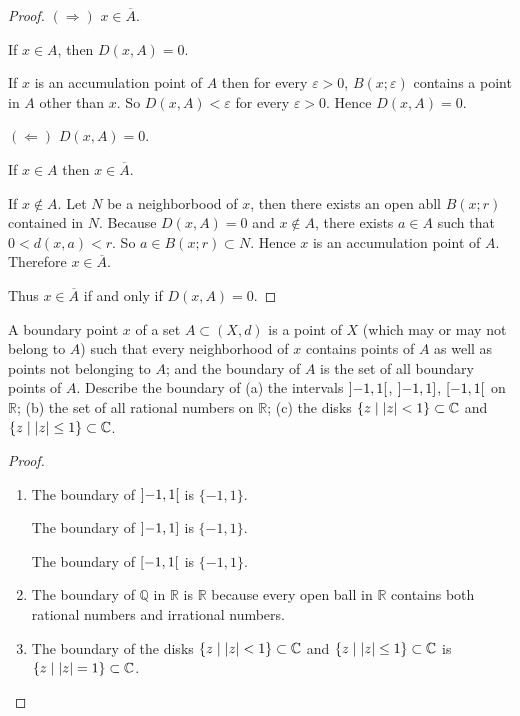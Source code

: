 \begin{proof}
    $(\Rightarrow)$ $x\in \overline{A}$.

    If $x\in A$, then $D(x, A) = 0$.

    If $x$ is an accumulation point of $A$ then for every $\varepsilon > 0$, $B(x; \varepsilon)$ contains a point in $A$ other than $x$. So $D(x, A) < \varepsilon$ for every $\varepsilon > 0$. Hence $D(x, A) = 0$.

    $(\Leftarrow)$ $D(x, A) = 0$.

    If $x\in A$ then $x\in \overline{A}$.

    If $x\notin A$. Let $N$ be a neighborbood of $x$, then there exists an open abll $B(x; r)$ contained in $N$. Because $D(x, A) = 0$ and $x\notin A$, there exists $a\in A$ such that $0 < d(x, a) < r$. So $a\in B(x; r) \subset N$. Hence $x$ is an accumulation point of $A$. Therefore $x\in \overline{A}$.

    Thus $x\in \overline{A}$ if and only if $D(x, A) = 0$.
\end{proof}

\begin{exercise}[Boundary]\label{chapter1:section3:exercise11}
    A boundary point $x$ of a set $A\subset (X, d)$ is a point of $X$ (which may or may not belong to $A$) such that every neighborhood of $x$ contains points of $A$ as well as points not belonging to $A$; and the boundary of $A$ is the set of all boundary points of $A$. Describe the boundary of (a) the intervals $\left]{-1, 1}\right[$, $\left]{-1, 1}\right]$, $\left[{-1, 1}\right[$ on $\mathbb{R}$; (b) the set of all rational numbers on $\mathbb{R}$; (c) the disks $\{ z\mid \left\vert{z}\right\vert < 1 \}\subset \mathbb{C}$ and $\{ z\mid \left\vert{z}\right\vert \leq 1 \}\subset \mathbb{C}$.
\end{exercise}

\begin{proof}
    \begin{enumerate}[label={(\alph*)}]
        \item The boundary of $\left]{-1, 1}\right[$ is $\{ -1, 1 \}$.

              The boundary of $\left]{-1, 1}\right]$ is $\{ -1, 1 \}$.

              The boundary of $\left[{-1, 1}\right[$ is $\{ -1, 1 \}$.
        \item The boundary of $\mathbb{Q}$ in $\mathbb{R}$ is $\mathbb{R}$ because every open ball in $\mathbb{R}$ contains both rational numbers and irrational numbers.
        \item The boundary of the disks $\{ z\mid \left\vert{z}\right\vert < 1 \}\subset \mathbb{C}$ and $\{ z\mid \left\vert{z}\right\vert \leq 1 \}\subset \mathbb{C}$ is $\{ z\mid \left\vert{z}\right\vert = 1 \}\subset \mathbb{C}$.
    \end{enumerate}
\end{proof}

